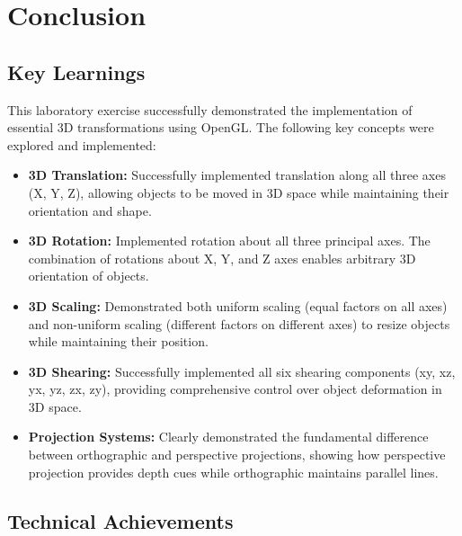 \documentclass[12pt,a4paper]{article}
\begin{document}
\section{Conclusion}

\subsection{Key Learnings}
This laboratory exercise successfully demonstrated the implementation of essential 3D transformations using OpenGL. The following key concepts were explored and implemented:

\begin{itemize}
    \item \textbf{3D Translation:} Successfully implemented translation along all three axes (X, Y, Z), allowing objects to be moved in 3D space while maintaining their orientation and shape.
    
    \item \textbf{3D Rotation:} Implemented rotation about all three principal axes. The combination of rotations about X, Y, and Z axes enables arbitrary 3D orientation of objects.
    
    \item \textbf{3D Scaling:} Demonstrated both uniform scaling (equal factors on all axes) and non-uniform scaling (different factors on different axes) to resize objects while maintaining their position.
    
    \item \textbf{3D Shearing:} Successfully implemented all six shearing components (xy, xz, yx, yz, zx, zy), providing comprehensive control over object deformation in 3D space.
    
    \item \textbf{Projection Systems:} Clearly demonstrated the fundamental difference between orthographic and perspective projections, showing how perspective projection provides depth cues while orthographic maintains parallel lines.
\end{itemize}

\subsection{Technical Achievements}
\end{document}
